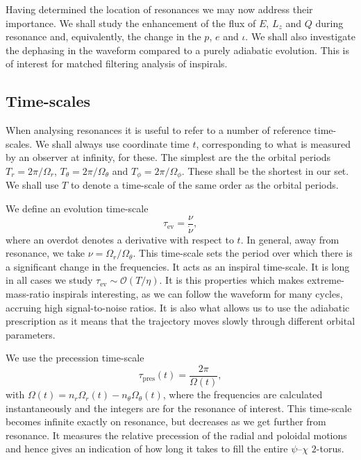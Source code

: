 \documentclass[aps,prd,amsfonts,amssymb,amsmath,nofootinbib,reprint,showpacs]{revtex4-1}
\newcommand{\sub}[1]{\ensuremath{_\text{#1}}}
\newcommand{\order}[1]{\ensuremath{\mathcal{O}({#1})}}
\begin{document}
Having determined the location of resonances we may now address their importance. We shall study the enhancement of the flux of $E$, $L_z$ and $Q$ during resonance and, equivalently, the change in the $p$, $e$ and $\iota$. We shall also investigate the dephasing in the waveform compared to a purely adiabatic evolution. This is of interest for matched filtering analysis of inspirals.

\subsection{Time-scales}

When analysing resonances it is useful to refer to a number of reference time-scales. We shall always use coordinate time $t$, corresponding to what is measured by an observer at infinity, for these. The simplest are the the orbital periods $T_r = 2\pi/\Omega_r$, $T_\theta = 2\pi/\Omega_\theta$ and $T_\phi = 2\pi/\Omega_\phi$. These shall be the shortest in our set. We shall use $T$ to denote a time-scale of the same order as the orbital periods.

We define an evolution time-scale
\begin{equation}
\tau\sub{ev} = \frac{\nu}{\dot{\nu}},
\end{equation}
where an overdot denotes a derivative with respect to $t$. In general, away from resonance, we take $\nu = \Omega_r/\Omega_\theta$. This time-scale sets the period over which there is a significant change in the frequencies. It acts as an inspiral time-scale. It is long in all cases we study $\tau\sub{ev} \sim \order{T/\eta}$. It is this properties which makes extreme-mass-ratio inspirals interesting, as we can follow the waveform for many cycles, accruing high signal-to-noise ratios. It is also what allows us to use the adiabatic prescription as it means that the trajectory moves slowly through different orbital parameters.

We use the precession time-scale
\begin{equation}
\tau\sub{pres}(t) = \frac{2\pi}{\Omega(t)},
\label{eq:t-pres}
\end{equation}
with $\Omega(t) = n_r \Omega_r(t) - n_\theta \Omega_\theta(t)$, where the frequencies are calculated instantaneously and the integers are for the resonance of interest. This time-scale becomes infinite exactly on resonance, but decreases as we get further from resonance. It measures the relative precession of the radial and poloidal motions and hence gives an indication of how long it takes to fill the entire $\psi$--$\chi$ $2$-torus.
\end{document}
